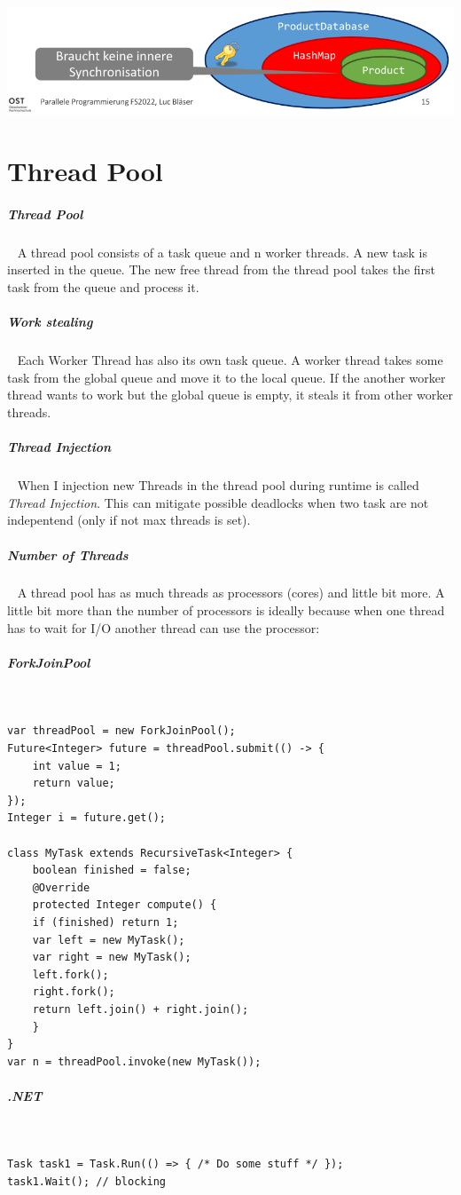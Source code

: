 \documentclass[8pt,twoside,landscape]{extarticle}
\begin{document}
\begin{multicols}{5}
{
\begin{center}
\includegraphics[width=.9\linewidth]{img/object_confinement.png}
\end{center}
\label{fig:example-of-object-confinement}
}
\section{Thread Pool}
\label{sec:org9115dc9}
\subparagraph{Thread Pool} \
\label{sec:org86d8aae}
A thread pool consists of a task queue and n worker threads.
A new task is inserted in the queue.
The new free thread from the thread pool takes the first task from the queue and process it.

\subparagraph{Work stealing} \
\label{sec:org770b5fe}
Each Worker Thread has also its own task queue.
A worker thread takes some task from the global queue and move it to the local queue.
If the another worker thread wants to work but the global queue is empty, it steals it from other worker threads.
\subparagraph{Thread Injection} \
\label{sec:org518f25c}
When I injection new Threads in the thread pool during runtime is called \emph{Thread Injection}.
This can mitigate possible deadlocks when two task are not indepentend (only if not max threads is set).
\subparagraph{Number of Threads} \
\label{sec:orgdc34d9d}
A thread pool has as much threads as processors (cores) and little bit more.
A little bit more than the number of processors is ideally because when one thread has to wait for I/O another thread can use the processor:

\subparagraph{ForkJoinPool} \
\label{sec:org89729dc}
\lstset{language=java,label= ,caption= ,captionpos=b,numbers=none}
\begin{lstlisting}
var threadPool = new ForkJoinPool();
Future<Integer> future = threadPool.submit(() -> {
	int value = 1;
	return value;
});
Integer i = future.get();

class MyTask extends RecursiveTask<Integer> {
    boolean finished = false;
    @Override
    protected Integer compute() {
	if (finished) return 1;
	var left = new MyTask();
	var right = new MyTask();
	left.fork();
	right.fork();
	return left.join() + right.join();
    }
}
var n = threadPool.invoke(new MyTask());
\end{lstlisting}
\subparagraph{.NET} \
\label{sec:org4568f30}
\lstset{language=csharp,label= ,caption= ,captionpos=b,numbers=none}
\begin{lstlisting}
Task task1 = Task.Run(() => { /* Do some stuff */ });
task1.Wait(); // blocking


\end{lstlisting}
\end{multicols}
\end{document}

